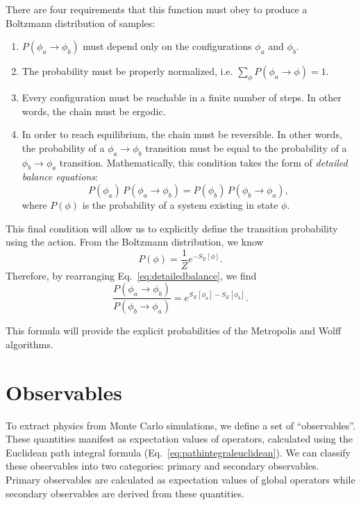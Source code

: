 \documentclass[12pt]{report}
\begin{document}
There are four requirements that this function must obey to produce a Boltzmann distribution of samples:
\begin{enumerate}
    \item $P(\phi_a \rightarrow \phi_b)$ must depend only on the configurations $\phi_a$ and $\phi_b$.
    \item The probability must be properly normalized, i.e. $\sum_{\phi} P(\phi_a \rightarrow \phi) = 1$.
    \item Every configuration must be reachable in a finite number of steps. In other words, the chain must be ergodic.
    \item In order to reach equilibrium, the chain must be reversible. In other words, the probability of a $\phi_a\rightarrow\phi_b$ transition must be equal to the probability of a $\phi_b\rightarrow\phi_a$ transition. Mathematically, this condition takes the form of \textit{detailed balance equations}:
\begin{equation}
    \label{eq:detailedbalance}
    P(\phi_a)\,P(\phi_a\rightarrow\phi_b) = P(\phi_b)\,P(\phi_b\rightarrow\phi_a),
\end{equation}
where $P(\phi)$ is the probability of a system existing in state $\phi$.
\end{enumerate}

This final condition will allow us to explicitly define the transition probability using the action. From the Boltzmann distribution, we know
\begin{equation}
    P(\phi) = \frac{1}{Z} e^{-S_E[\phi]}.
\end{equation}
Therefore, by rearranging Eq.~\ref{eq:detailedbalance}, we find
\begin{equation}
    \label{eq:detailedbalance2}
    \frac{P(\phi_a\rightarrow\phi_b)}{P(\phi_b\rightarrow\phi_a)} = e^{S_E[\phi_a] - S_E[\phi_b]}.
\end{equation}

This formula will provide the explicit probabilities of the Metropolis and Wolff algorithms.




\section{Observables}

To extract physics from Monte Carlo simulations, we define a set of ``observables''. These quantities manifest as expectation values of operators, calculated using the Euclidean path integral formula (Eq.~\ref{eq:pathintegraleuclidean}). We can classify these observables into two categories: primary and secondary observables. Primary observables are calculated as expectation values of global operators while secondary observables are derived from these quantities.
\end{document}
